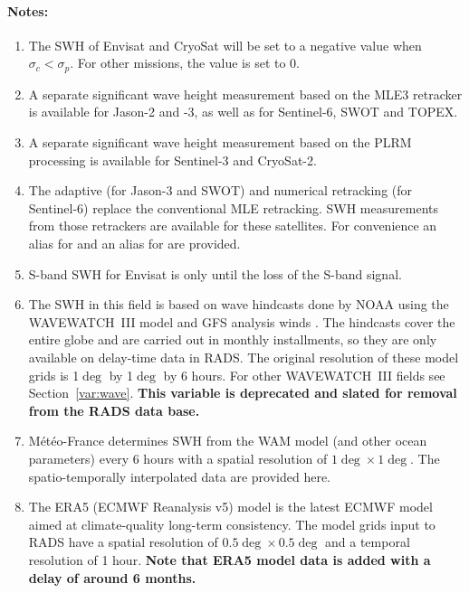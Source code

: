 \documentclass[a4paper,11pt,openany,natbib,nomargin]{thesis}
\newcommand\deprecated[1][This variable is]{\textbf{#1 deprecated and slated for removal from the RADS data base.}}
\newenvironment{notes}[1][Notes:]{\FloatBarrier\paragraph{#1}\begin{enumerate}}{\end{enumerate}}
\begin{document}
\begin{notes}
\item The SWH of Envisat and CryoSat will be set to a negative value when $\sigma_c<\sigma_p$. For other missions, the value is set to 0.\label{item:swh_ku}
\item A separate significant wave height measurement based on the MLE3 retracker is available for Jason-2 and -3, as well as for Sentinel-6, SWOT and TOPEX.\label{item:swh_ku_mle3}\label{item:swh_rms_ku_mle3}
\item A separate significant wave height measurement based on the PLRM processing is available for Sentinel-3 and CryoSat-2.\label{item:swh_ku_plrm}\label{item:swh_rms_ku_plrm}
\item The adaptive (for Jason-3 and SWOT) and numerical retracking (for Sentinel-6) replace the conventional MLE retracking. SWH measurements from those retrackers are available for these satellites. For convenience an alias  for  and an alias  for  are provided.\label{item:swh_ku_adaptive}\label{item:swh_ku_nr}\label{item:swh_rms_ku_adaptive}\label{item:swh_rms_ku_nr}
\item S-band SWH for Envisat is only until the loss of the S-band signal.\label{item:swh_s}\label{item:swh_rms_s}
\item The SWH in this field is based on wave hindcasts done by NOAA using the WAVEWATCH~III model \citep{tolman2009} and GFS analysis winds \citep{chawla2011}. The hindcasts cover the entire globe and are carried out in monthly installments, so they are only available on delay-time data in RADS. The original resolution of these model grids is 1$\deg$ by 1$\deg$ by 6 hours. For other WAVEWATCH~III fields see Section~\ref{var:wave}. \deprecated\label{item:swh_ww3}
\item M\'et\'eo-France determines SWH from the WAM model (and other ocean parameters) every 6 hours with a spatial resolution of $1\deg\times1\deg$. The spatio-temporally interpolated data are provided here.\label{item:swh_mfwam}
\item The ERA5 (ECMWF Reanalysis v5) model is the latest ECMWF model aimed at climate-quality long-term consistency. The model grids input to RADS have a spatial resolution of $0.5\deg\times 0.5\deg$ and a temporal resolution of 1 hour. \textbf{Note that ERA5 model data is added with a delay of around 6 months.}\label{item:swh_era5}
\end{notes}
\end{document}
